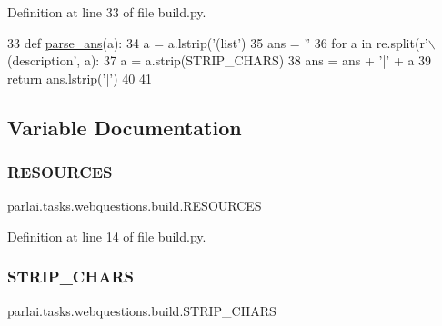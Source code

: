 Definition at line 33 of file build.\+py.


\begin{DoxyCode}
33 \textcolor{keyword}{def }\hyperlink{namespaceparlai_1_1tasks_1_1webquestions_1_1build_a969c68eeef096e477def172c88928eb3}{parse\_ans}(a):
34     a = a.lstrip(\textcolor{stringliteral}{'(list'})
35     ans = \textcolor{stringliteral}{''}
36     \textcolor{keywordflow}{for} a \textcolor{keywordflow}{in} re.split(\textcolor{stringliteral}{r'\(\backslash\)(description'}, a):
37         a = a.strip(STRIP\_CHARS)
38         ans = ans + \textcolor{stringliteral}{'|'} + a
39     \textcolor{keywordflow}{return} ans.lstrip(\textcolor{stringliteral}{'|'})
40 
41 
\end{DoxyCode}


\subsection{Variable Documentation}
\mbox{\label{namespaceparlai_1_1tasks_1_1webquestions_1_1build_ac4b3a91c9fccce1e8d32040a57332c07}} 
\subsubsection{\texorpdfstring{R\+E\+S\+O\+U\+R\+C\+ES}{RESOURCES}}
{\footnotesize\ttfamily parlai.\+tasks.\+webquestions.\+build.\+R\+E\+S\+O\+U\+R\+C\+ES}



Definition at line 14 of file build.\+py.

\mbox{\label{namespaceparlai_1_1tasks_1_1webquestions_1_1build_a9f4c36987a516850b209c40be8b822ae}} 
\subsubsection{\texorpdfstring{S\+T\+R\+I\+P\+\_\+\+C\+H\+A\+RS}{STRIP\_CHARS}}
{\footnotesize\ttfamily parlai.\+tasks.\+webquestions.\+build.\+S\+T\+R\+I\+P\+\_\+\+C\+H\+A\+RS}




